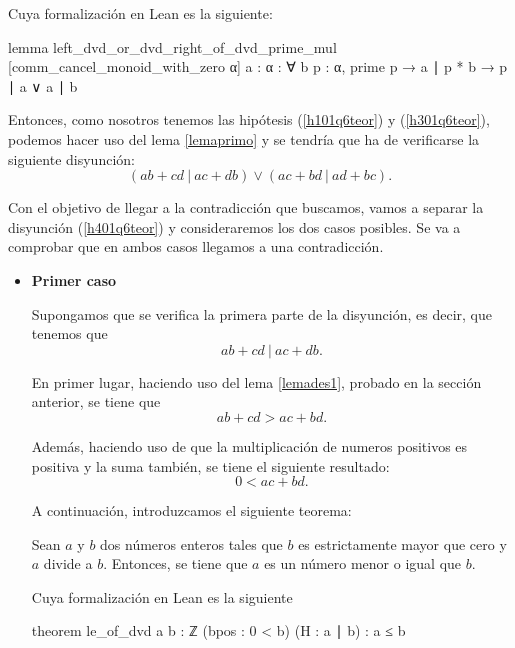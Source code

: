 \begin{demostracion}
  Cuya formalización en Lean es la siguiente:
  \begin{leancode}
  lemma left_dvd_or_dvd_right_of_dvd_prime_mul
  [comm_cancel_monoid_with_zero α] {a : α} :
  ∀ {b p : α}, prime p → a ∣ p * b → p ∣ a ∨ a ∣ b
  \end{leancode}

  Entonces, como nosotros tenemos las hipótesis (\ref{h101q6teor}) y
  (\ref{h301q6teor}), podemos hacer uso del lema \ref{lemaprimo} y se
  tendría que ha de verificarse la siguiente disyunción:
  \begin{equation}\tag{h4}\label{h401q6teor}
    (ab+cd\ |\ ac+db) \lor (ac+bd\ |\ ad+bc).
  \end{equation}

  Con el objetivo de llegar a la contradicción que buscamos, vamos a
  separar la disyunción (\ref{h401q6teor}) y consideraremos los dos
  casos posibles.  Se va a comprobar que en ambos casos llegamos a una
  contradicción.
  \begin{itemize}
  \item \textbf{Primer caso}

    Supongamos que se verifica la primera parte de la disyunción, es
    decir, que tenemos que
    \begin{equation}\tag{hj}\label{hj01q6teor}
      ab+cd\ |\ ac+db.
    \end{equation}

    En primer lugar, haciendo uso del lema \ref{lemades1}, probado en la
    sección anterior, se tiene que
    \begin{equation}\tag{hj1}\label{hj101q6}
      ab+cd > ac+bd.
    \end{equation}

    Además, haciendo uso de que la multiplicación de numeros positivos
    es positiva y la suma también, se tiene el siguiente resultado:
    \begin{equation}\label{hpj01q6}\tag{hpj}
      0 < ac+bd.
    \end{equation}

    A continuación, introduzcamos el siguiente teorema:
    \begin{teorema}\label{teoremaleq}
      Sean \(a\) y \(b\) dos números enteros tales que \(b\) es
      estrictamente mayor que cero y \(a\) divide a \(b\). Entonces, se
      tiene que \(a\) es un número menor o igual que
      \(b\).
    \end{teorema}

    Cuya formalización en Lean es la siguiente
    \begin{leancode}
    theorem le_of_dvd {a b : ℤ}
    (bpos : 0 < b)
    (H : a ∣ b) :
    a ≤ b
    \end{leancode}


\end{itemize}
\end{demostracion}
